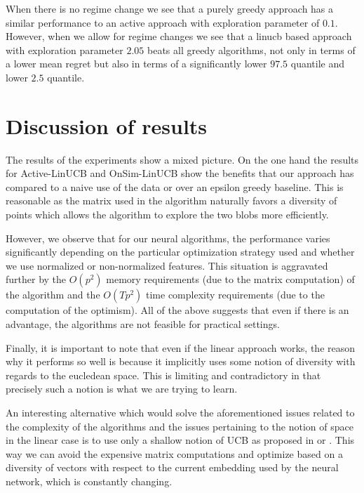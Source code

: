 \documentclass{article}
\begin{document}
When there is no regime change we see that a purely greedy approach has a similar performance to an active approach with exploration parameter
of $0.1$.
However, when we allow for regime changes we see that a linucb based approach with exploration parameter $2.05$ beats all greedy algorithms,
not only in terms of a lower mean regret but also in terms of a significantly lower $97.5$ quantile and lower $2.5$ quantile.

\section{Discussion of results}
The results of the experiments show a mixed picture.
On the one hand the results for Active-LinUCB and OnSim-LinUCB show the benefits that our approach has
compared to a naive use of the data or over an epsilon greedy baseline.
This is reasonable as the matrix used in the algorithm naturally favors a diversity of points which allows
the algorithm to explore the two blobs more efficiently.

However, we observe that for our neural algorithms, the performance varies significantly depending on the particular optimization
strategy used and whether we use normalized or non-normalized features.
This situation is aggravated further by the $O(p^2)$ memory requirements (due to the matrix computation) of the algorithm and the $O(Tp^2)$ time complexity requirements (due to the computation of the optimism).
All of the above suggests that even if there is an advantage, the algorithms are not feasible for practical settings.

Finally, it is important to note that even if the linear approach works, the reason why it performs so well is because it implicitly uses
some notion of diversity with regards to the eucledean space.
This is limiting and contradictory in that precisely such a notion is what we are trying to learn.

An interesting alternative which would solve the aforementioned issues related to the complexity of the algorithms and
the issues pertaining to the notion of space in the linear case is to use only a shallow notion of UCB as proposed in \cite{shallow} or
\cite{deep-bayesian-bandits-show-down}.
This way we can avoid the expensive matrix computations and optimize based on a diversity of vectors with respect to the current embedding
used by the neural network, which is constantly changing.
\end{document}
